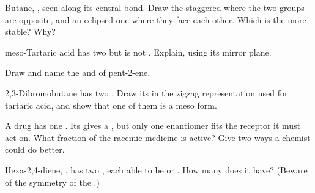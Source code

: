 \begin{exercise}[$\star\star$]\label{exo:g12:stereochemistry:9}
Butane, , seen along its central bond. Draw the
staggered  where the two  groups are opposite, and
an eclipsed one where they face each other. Which is the more stable?
Why?
\end{exercise}

\begin{exercise}[$\star\star$]\label{exo:g12:stereochemistry:10}
meso-Tartaric acid has two  but is not .
Explain, using its mirror plane.
\end{exercise}

\begin{exercise}[$\star\star$]\label{exo:g12:stereochemistry:11}
Draw and name the  and  of pent-2-ene.
\end{exercise}

\begin{exercise}[$\star\star\star$]\label{exo:g12:stereochemistry:12}
2,3-Dibromobutane  has two .
Draw its  in the zigzag representation used for tartaric
acid, and show that one of them is a meso form.
\end{exercise}

\begin{exercise}[$\star\star\star$]\label{exo:g12:stereochemistry:13}
A drug  has one . Its  gives a , but only one enantiomer fits the  receptor it must act
on. What fraction of the racemic medicine is active? Give two ways a
chemist could do better.
\end{exercise}

\begin{exercise}[$\star\star\star$]\label{exo:g12:stereochemistry:14}
Hexa-2,4-diene, , has two , each
able to be  or . How many  does it have? (Beware of the
symmetry of the .)
\end{exercise}


